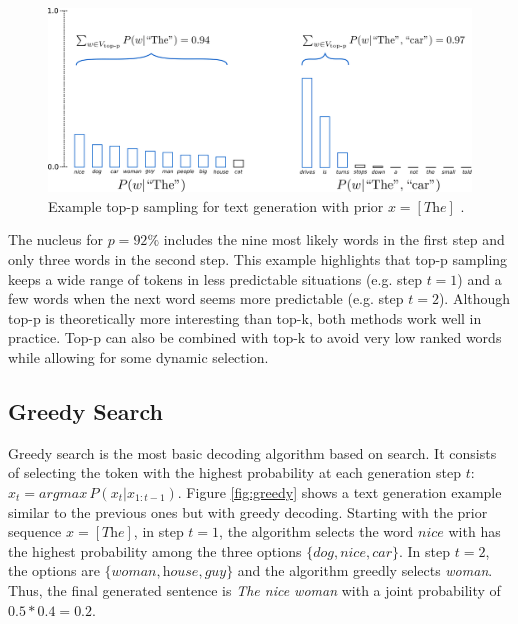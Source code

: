 \begin{figure}[!h]
 \centering
 \includegraphics[width=0.9\columnwidth]{imgs/background/topp.png}
 \caption{Example top-p sampling for text generation with prior $x = [\textit{The}]$ \cite{platen2020}.}
 \label{fig:topp}
\end{figure}

The nucleus for $p=92\%$ includes the nine most likely words in the first step and only three words in the second step. This example highlights that top-p sampling keeps a wide range of tokens in less predictable situations (e.g. step $t=1$) and a few words when the next word seems more predictable (e.g. step $t=2$). Although top-p is theoretically more interesting than top-k, both methods work well in practice. Top-p can also be combined with top-k to avoid very low ranked words while allowing for some dynamic selection.

\subsection{Greedy Search}

Greedy search is the most basic decoding algorithm based on search. It consists of selecting the token with the highest probability at each generation step $t$: $x_t = argmax \, P(x_t|x_{1:t-1})$. Figure \ref{fig:greedy} shows a text generation example similar to the previous ones but with greedy decoding.
Starting with the prior sequence $x = [\textit{The}]$, in step $t=1$, the algorithm selects the word $\textit{nice}$ with has the highest probability among the three options $\{ \textit{dog}, \textit{nice}, \textit{car} \}$. In step $t=2$, the options are $\{ \textit{woman}, \textit{house}, \textit{guy} \}$ and the algorithm greedly selects \textit{woman}. Thus, the final generated sentence is \textit{The nice woman} with a joint probability of $0.5*0.4=0.2$.

